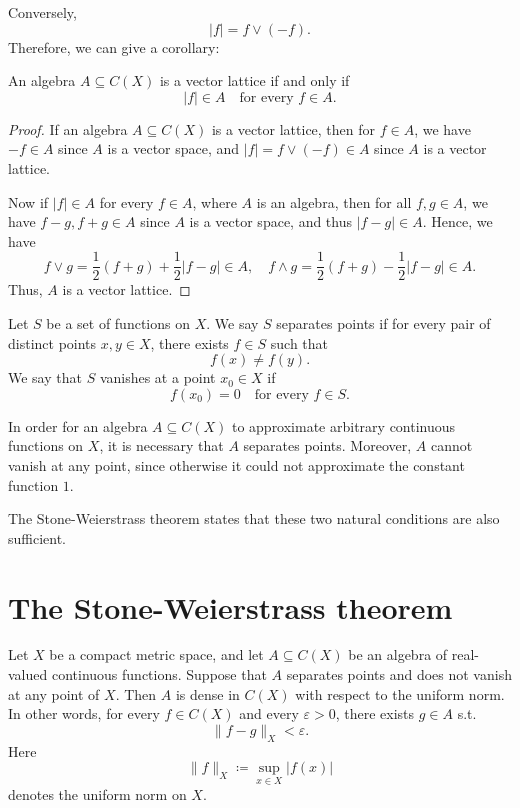 Conversely, 
\[
    \vert f \vert = f \lor (-f). 
\]
Therefore, we can give a corollary:
\begin{corollary} \label{cl: algebra is vector lattice iff statement}
    An algebra \(A \subseteq C(X)\) is a vector lattice if and only if 
    \[
        \vert f \vert \in A \quad \text{for every } f \in A.  
    \]     
\end{corollary}

\begin{proof}
    If an algebra \(A \subseteq C(X)\) is a vector lattice, then for \(f \in A\), we have \(-f \in A\) since \(A\) is a vector space, and \(\vert f \vert = f \lor (-f) \in A\) since \(A\) is a vector lattice. 

    Now if \(\vert f \vert \in A\) for every \(f \in A\), where \(A\) is an algebra, then for all \(f, g \in A\), we have \(f - g, f + g \in A\) since \(A\) is a vector space, and thus \(\vert f - g \vert \in A\). Hence, we have
    \[
        f \lor g = \frac{1}{2} (f + g) + \frac{1}{2} \vert f - g \vert \in A, \quad f \land g = \frac{1}{2} (f + g) - \frac{1}{2} \vert f - g \vert \in A. 
    \]             
    Thus, \(A\) is a vector lattice. 
\end{proof}

\begin{definition}
    Let \(S\) be a set of functions on \(X\). We say \(S\) separates points if for every pair of distinct points \(x, y \in X\), there exists \(f \in S\) such that 
    \[
        f(x) \neq f(y).
    \]     
    We say that \(S\) vanishes at a point \(x_0 \in X\) if 
    \[
        f(x_0) = 0 \quad \text{for every } f \in S. 
    \]   
\end{definition}

In order for an algebra \(A \subseteq C(X)\) to approximate arbitrary continuous functions on \(X\), it is necessary that \(A\) separates points. Moreover, \(A\) cannot vanish at any point, since otherwise it could not approximate the constant function \(1\). 

The Stone-Weierstrass theorem states that these two natural conditions are also sufficient. 

\section{The Stone-Weierstrass theorem}
\begin{theorem} \label{thm: Stone-Weierstrass}
    Let \(X\) be a compact metric space, and let \(A \subseteq C(X)\) be an algebra of real-valued continuous functions. Suppose that \(A\) separates points and does not vanish at any point of \(X\). Then \(A\) is dense in \(C(X)\) with respect to the uniform norm. In other words, for every \(f \in C(X)\) and every \(\varepsilon > 0\), there exists \(g \in A\) s.t. 
    \[
        \lVert f - g \rVert_X < \varepsilon. 
    \]         
    Here 
    \[
        \lVert f \rVert_X \coloneqq \sup _{x \in X} \vert f(x) \vert  
    \]
    denotes the uniform norm on \(X\). 
\end{theorem}

